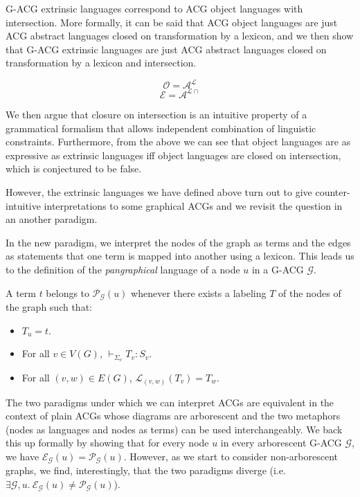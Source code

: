 \documentclass[twocolumn]{article}
\begin{document}
G-ACG extrinsic languages correspond to ACG object languages with
intersection. More formally, it can be said that ACG object languages are just
ACG abstract languages closed on transformation by a lexicon, and we then show
that G-ACG extrinsic languages are just ACG abstract languages closed on
transformation by a lexicon and intersection.

$$
\mathcal{O} = \mathcal{A}^{\mathcal{L}}
$$
$$
\mathcal{E} = \mathcal{A}^{\mathcal{L}{\cap}}
$$

We then argue that closure on intersection is an intuitive property of a
grammatical formalism that allows independent combination of linguistic
constraints. Furthermore, from the above we can see that object
languages are as expressive as extrinsic languages iff object languages
are closed on intersection, which is conjectured to be false.

However, the extrinsic languages we have defined above turn out to give
counter-intuitive interpretations to some graphical ACGs and we revisit the
question in an another paradigm.

In the new paradigm, we interpret the nodes of the graph as terms and the
edges as statements that one term is mapped into another using a lexicon. This
leads us to the definition of the \emph{pangraphical} language of a node $u$
in a G-ACG $\mathcal{G}$.

A term $t$ belongs to $\mathcal{P}_{\mathcal{G}}(u)$ whenever there
exists a labeling $T$ of the nodes of the graph such that:

\begin{itemize}
  \item $T_u = t$.
  \item For all $v \in V(G)$, $\vdash_{\Sigma_v} T_v : S_v$.
  \item For all $(v,w) \in E(G)$, $\mathcal{L}_{(v,w)}(T_v) = T_w$.
\end{itemize}

The two paradigms under which we can interpret ACGs are equivalent in
the context of plain ACGs whose diagrams are arborescent and the two
metaphors (nodes as languages and nodes as terms) can be used
interchangeably. We back this up formally by showing that for every node
$u$ in every arborescent G-ACG $\mathcal{G}$, we have
$\mathcal{E}_{\mathcal{G}}(u) = \mathcal{P}_{\mathcal{G}}(u)$. However,
as we start to consider non-arborescent graphs, we find, interestingly,
that the two paradigms diverge (i.e. $\exists \mathcal{G},
u.\ \mathcal{E}_{\mathcal{G}}(u) \neq \mathcal{P}_{\mathcal{G}}(u)$).
\end{document}
